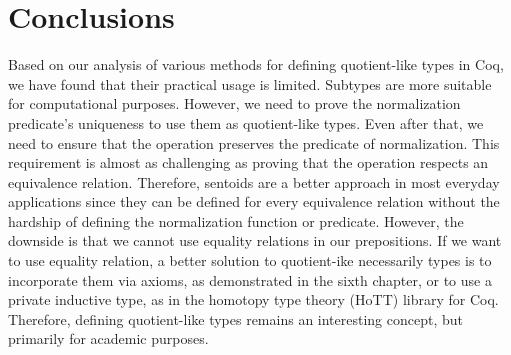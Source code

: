 \section{Conclusions}
Based on our analysis of various methods for defining quotient-like types in Coq, we have found that their practical usage is limited. Subtypes are more suitable for computational purposes. However, we need to prove the normalization predicate's uniqueness to use them as quotient-like types. Even after that, we need to ensure that the operation preserves the predicate of normalization. This requirement is almost as challenging as proving that the operation respects an equivalence relation. Therefore, sentoids are a better approach in most everyday applications since they can be defined for every equivalence relation without the hardship of defining the normalization function or predicate. However, the downside is that we cannot use equality relations in our prepositions. If we want to use equality relation, a better solution to quotient-ike necessarily types is to incorporate them via axioms, as demonstrated in the sixth chapter, or to use a private inductive type, as in the homotopy type theory (HoTT) library for Coq. Therefore, defining quotient-like types remains an interesting concept, but primarily for academic purposes.